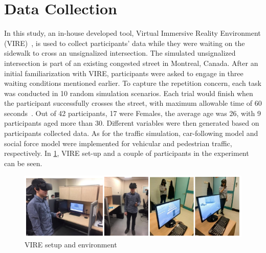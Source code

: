 \section{Data Collection}
\label{S:D3}
In this study, an in-house developed tool, Virtual Immersive Reality Environment (VIRE)~\cite{farooq2018virtual}, is used to collect participants’ data while they were waiting on the sidewalk to cross an unsignalized intersection. The simulated unsignalized intersection is part of an existing congested street in Montreal, Canada. After an initial familiarization with VIRE, participants were asked to engage in three waiting conditions mentioned earlier. To capture the repetition concern, each task was conducted in 10 random simulation scenarios. Each trial would finish when the participant successfully crosses the street, with maximum allowable time of 60 seconds~\cite{sobhani2018impact}. Out of 42 participants, 17 were Females, the average age was 26, with 9 participants aged more than 30. Different variables were then generated based on participants collected data. As for the traffic simulation, car-following model and social force model were implemented for vehicular and pedestrian traffic, respectively. In \cref{fig:DVIRE}, VIRE set-up and a couple of participants in the experiment can be seen.
\begin{figure}
    \centering
    \includegraphics[scale=0.6]{chapter_3/figures/distract.png}
    \caption{VIRE setup and environment}
    \label{fig:DVIRE}
\end{figure}
